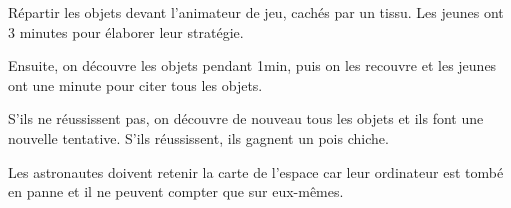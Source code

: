 \documentclass{grand-jeu}
\begin{document}
\begin{liste-materiel}
\end{liste-materiel}

\begin{regles}
Répartir les objets devant l’animateur de jeu, cachés par un tissu. Les jeunes ont 3 minutes pour élaborer leur stratégie.

Ensuite, on découvre les objets pendant 1min, puis on les recouvre et les jeunes ont une minute pour citer tous les objets.

S’ils ne réussissent pas, on découvre de nouveau tous les objets et ils font une nouvelle tentative. S’ils réussissent, ils gagnent un pois chiche.
\end{regles}

\begin{imaginaire}
Les astronautes doivent retenir la carte de l’espace car leur ordinateur est tombé en panne et il ne peuvent compter que sur eux-mêmes.
\end{imaginaire}

\begin{moments-stop}
\end{moments-stop}
\end{document}
